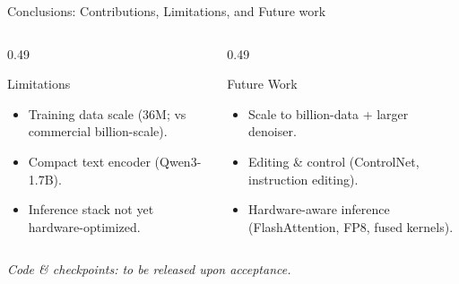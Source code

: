 \documentclass[aspectratio=169,10pt]{beamer}
\begin{document}
\begin{frame}{Conclusions: Contributions, Limitations, and Future work}
  \begin{columns}[T,onlytextwidth]
    \begin{column}{0.49\textwidth}
      \begin{block}{Limitations}
        \scriptsize
        \begin{itemize}[label=$\bullet$,leftmargin=1.2em,topsep=0pt,itemsep=2pt,parsep=0pt]
          \item Training data scale (36M; vs commercial billion-scale).
          \item Compact text encoder (Qwen3-1.7B).
          \item Inference stack not yet hardware-optimized.
        \end{itemize}
      \end{block}
    \end{column}
    \begin{column}{0.49\textwidth}
      \begin{block}{Future Work}
        \scriptsize
        \begin{itemize}[label=$\bullet$,leftmargin=1.2em,topsep=0pt,itemsep=2pt,parsep=0pt]
          \item Scale to billion-data + larger denoiser.
          \item Editing \& control (ControlNet, instruction editing).
          \item Hardware-aware inference (FlashAttention, FP8, fused kernels).
        \end{itemize}
      \end{block}
    \end{column}
  \end{columns}
  \vspace{0.3em}
  \begin{center}
    \scriptsize\color{rapdgray}\itshape Code \& checkpoints: to be released upon acceptance.
  \end{center}
\end{frame}

\end{document}
